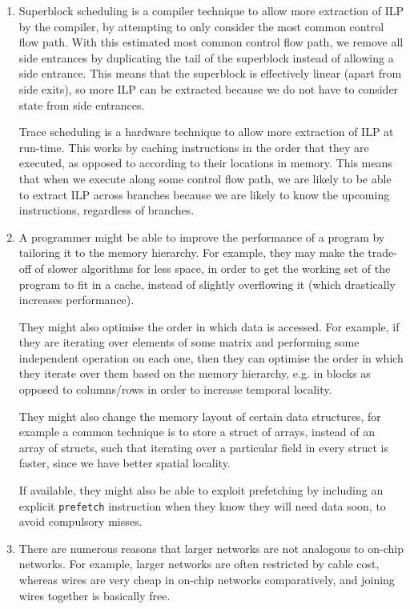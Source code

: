 


\begin{enumerate}[label=(\alph*)]
  \item
    Superblock scheduling is a compiler technique to allow more extraction of ILP by the compiler, by attempting to only consider the most common control flow path. With this estimated most common control flow path, we remove all side entrances by duplicating the tail of the superblock instead of allowing a side entrance. This means that the superblock is effectively linear (apart from side exits), so more ILP can be extracted because we do not have to consider state from side entrances.

    Trace scheduling is a hardware technique to allow more extraction of ILP at run-time. This works by caching instructions in the order that they are executed, as opposed to according to their locations in memory. This means that when we execute along some control flow path, we are likely to be able to extract ILP across branches because we are likely to know the upcoming instructions, regardless of branches.

  \item
    A programmer might be able to improve the performance of a program by tailoring it to the memory hierarchy. For example, they may make the trade-off of slower algorithms for less space, in order to get the working set of the program to fit in a cache, instead of slightly overflowing it (which drastically increases performance).

    They might also optimise the order in which data is accessed. For example, if they are iterating over elements of some matrix and performing some independent operation on each one, then they can optimise the order in which they iterate over them based on the memory hierarchy, e.g. in blocks as opposed to columns/rows in order to increase temporal locality.

    They might also change the memory layout of certain data structures, for example a common technique is to store a struct of arrays, instead of an array of structs, such that iterating over a particular field in every struct is faster, since we have better spatial locality.

    If available, they might also be able to exploit prefetching by including an explicit \texttt{prefetch} instruction when they know they will need data soon, to avoid compulsory misses.

  \item
    There are numerous reasons that larger networks are not analogous to on-chip networks. For example, larger networks are often restricted by cable cost, whereas wires are very cheap in on-chip networks comparatively, and joining wires together is basically free.


\end{enumerate}
